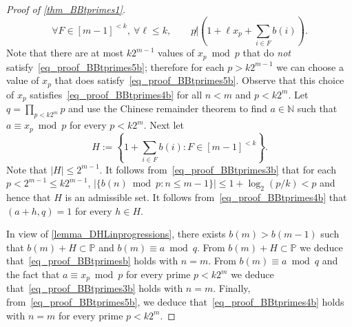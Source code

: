 \documentclass[10pt,dvipsnames]{article}
\theoremstyle{definition}
\theoremstyle{plain}
\renewcommand{\P}{\mathbb{P}}
\newcommand{\N}{\mathbb{N}}
\begin{document}
\begin{appendices}
\begin{proof}[Proof of \cref{thm_BBtprimes1}]
\begin{equation}\label{eq_proof_BBtprimes5b}
    \forall F\in[m-1]^{<k},\ \forall\ell\leq k,\qquad p\not|\left(1+\ell x_p+\sum_{i\in F}b(i)\right).
\end{equation}
Note that there are at most $k2^{m-1}$ values of $x_p\bmod p$ that do \emph{not} satisfy~\eqref{eq_proof_BBtprimes5b}; therefore for each $p>k2^{m-1}$ we can choose a value of $x_p$ that does satisfy~\eqref{eq_proof_BBtprimes5b}.
Observe that this choice of $x_p$ satisfies~\eqref{eq_proof_BBtprimes4b} for all $n<m$ and $p<k2^{m}$.
Let $q=\prod_{p<k2^{m}}p$ and use the Chinese remainder theorem to find $a\in\N$ such that $a\equiv x_p\bmod p$ for every $p<k2^{m}$.
Next let
$$H:=\left\{1+\sum_{i\in F}b(i):F\in[m-1]^{<k}\right\}.$$
Note that $|H|\leq 2^{m-1}$.
It follows from~\eqref{eq_proof_BBtprimes3b} that for each $p<2^{m-1}\leq k2^{m-1}$, $|\{b(n)\bmod p:n\leq m-1\}|\leq1+\log_2(p/k)< p$ and hence that $H$ is an admissible set.
It follows from~\eqref{eq_proof_BBtprimes4b} that $(a+h,q)=1$ for every $h\in H$.

In view of \cref{lemma_DHLinprogressions}, there exists $b(m)>b(m-1)$ such that $b(m)+H\subset\P$ and $b(m)\equiv a\bmod q$.
From $b(m)+H\subset\P$ we deduce that~\eqref{eq_proof_BBtprimesb} holds with $n=m$.
From $b(m)\equiv a\bmod q$ and the fact that $a\equiv x_p\bmod p$ for every prime $p<k2^{m}$ we deduce that~\eqref{eq_proof_BBtprimes3b} holds with $n=m$.
Finally, from~\eqref{eq_proof_BBtprimes5b}, we deduce that~\eqref{eq_proof_BBtprimes4b} holds with $n=m$ for every prime $p<k2^{m}$.
\end{proof}
\end{appendices}



\end{document}

